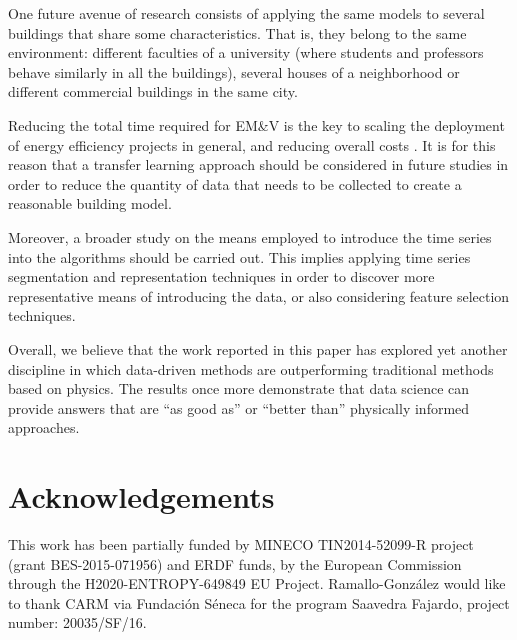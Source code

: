 \documentclass[10pt, conference, compsocconf]{IEEEtran}
\begin{document}
One future avenue of research consists of applying the same models to several buildings that share some characteristics. That is, they belong to the same environment: different faculties of a university (where students and professors behave similarly in all the buildings), several houses of a neighborhood or different commercial buildings in the same city.

Reducing the total time required for EM\&V is the key to scaling the deployment of energy efficiency projects in general, and reducing overall costs \cite{granderson2015automated}. It is for this reason that a transfer learning approach should be considered in future studies in order to reduce the quantity of data that needs to be collected to create a reasonable building model.

Moreover, a broader study on the means employed to introduce the time series into the algorithms should be carried out. This implies applying time series segmentation and representation techniques in order to discover more representative means of introducing the data, or also considering feature selection techniques.


Overall, we believe that the work reported in this paper has explored yet another discipline in which data-driven methods are outperforming traditional methods based on physics. The results once more demonstrate that data science can provide answers that are “as good as” or “better than” physically informed approaches.

\section*{Acknowledgements}

This work has been partially funded by MINECO TIN2014-52099-R project (grant BES-2015-071956) and ERDF funds, by the European Commission through the H2020-ENTROPY-649849 EU Project. Ramallo-Gonz\'alez would like to thank CARM via Fundaci\'on S\'eneca for the program Saavedra Fajardo, project number: 20035/SF/16.


%
%
\end{document}

